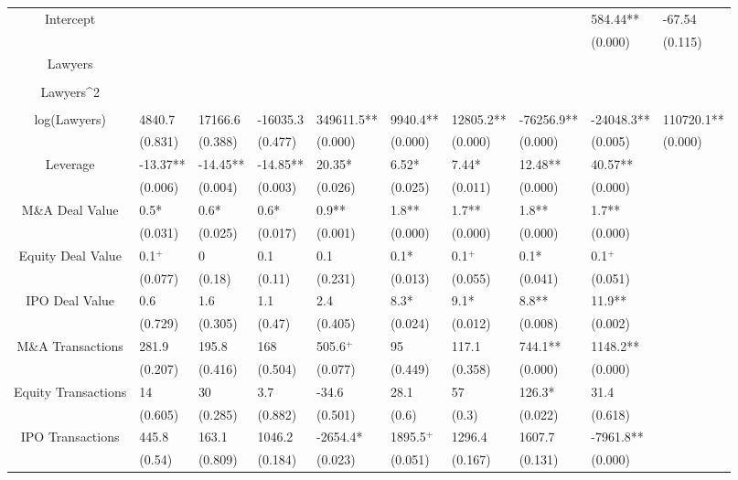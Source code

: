 \documentclass{article}
\begin{document}
\begin{table}[H]
\begin{tabular}{|clllllllll|}
Intercept &  &  &  &  &  &  &  & 584.44** & -67.54 \\ 
   &  &  &  &  &  &  &  & (0.000) & (0.115) \\ 
  Lawyers &  &  &  &  &  &  &  &  &  \\ 
   &  &  &  &  &  &  &  &  &  \\ 
  Lawyers^2 &  &  &  &  &  &  &  &  &  \\ 
   &  &  &  &  &  &  &  &  &  \\ 
  log(Lawyers) & 4840.7 & 17166.6 & -16035.3 & 349611.5** & 9940.4** & 12805.2** & -76256.9** & -24048.3** & 110720.1** \\ 
   & (0.831) & (0.388) & (0.477) & (0.000) & (0.000) & (0.000) & (0.000) & (0.005) & (0.000) \\ 
  Leverage & -13.37** & -14.45** & -14.85** & 20.35* & 6.52* & 7.44* & 12.48** & 40.57** &  \\ 
   & (0.006) & (0.004) & (0.003) & (0.026) & (0.025) & (0.011) & (0.000) & (0.000) &  \\ 
  M\&A Deal Value & 0.5* & 0.6* & 0.6* & 0.9** & 1.8** & 1.7** & 1.8** & 1.7** &  \\ 
   & (0.031) & (0.025) & (0.017) & (0.001) & (0.000) & (0.000) & (0.000) & (0.000) &  \\ 
  Equity Deal Value & 0.1$^{+}$ & 0 & 0.1 & 0.1 & 0.1* & 0.1$^{+}$ & 0.1* & 0.1$^{+}$ &  \\ 
   & (0.077) & (0.18) & (0.11) & (0.231) & (0.013) & (0.055) & (0.041) & (0.051) &  \\ 
  IPO Deal Value & 0.6 & 1.6 & 1.1 & 2.4 & 8.3* & 9.1* & 8.8** & 11.9** &  \\ 
   & (0.729) & (0.305) & (0.47) & (0.405) & (0.024) & (0.012) & (0.008) & (0.002) &  \\ 
  M\&A Transactions & 281.9 & 195.8 & 168 & 505.6$^{+}$ & 95 & 117.1 & 744.1** & 1148.2** &  \\ 
   & (0.207) & (0.416) & (0.504) & (0.077) & (0.449) & (0.358) & (0.000) & (0.000) &  \\ 
  Equity Transactions & 14 & 30 & 3.7 & -34.6 & 28.1 & 57 & 126.3* & 31.4 &  \\ 
   & (0.605) & (0.285) & (0.882) & (0.501) & (0.6) & (0.3) & (0.022) & (0.618) &  \\ 
  IPO Transactions & 445.8 & 163.1 & 1046.2 & -2654.4* & 1895.5$^{+}$ & 1296.4 & 1607.7 & -7961.8** &  \\ 
   & (0.54) & (0.809) & (0.184) & (0.023) & (0.051) & (0.167) & (0.131) & (0.000) &  \\ 

\end{tabular}
\end{table}
\end{document}
